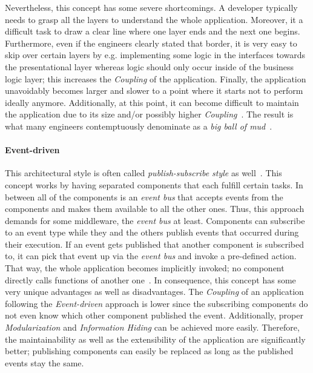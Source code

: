 \documentclass[12pt,a4paper,twoside]{report}
\begin{document}
Nevertheless, this concept has some severe shortcomings.
A developer typically needs to grasp all the layers to understand the whole application.
Moreover, it a difficult task to draw a clear line where one layer ends and the
next one begins.
Furthermore, even if the engineers clearly stated that border,
it is very easy to skip over certain layers by e.g. implementing some logic
in the interfaces towards the presentational layer whereas logic should only occur
inside of the business logic layer; this increases the \textit{Coupling} of the application.
Finally, the application unavoidably becomes larger and slower to a point
where it starts not to perform ideally anymore.
Additionally, at this point, it can become difficult to maintain the application due
to its size and/or possibly higher \textit{Coupling}~\cite{richards-sa-patterns}.
The result is what many engineers contemptuously denominate
as a \textit{big ball of mud}~\cite{fairbanks-sa}.

\paragraph{Event-driven}
This architectural style is often called \textit{publish-subscribe style} as well~\cite{fairbanks-sa}.
This concept works by having separated components that each fulfill certain tasks.
In between all of the components is an \textit{event bus} that accepts events from
the components and makes them available to all the other ones. Thus, this approach
demands for some middleware, the \textit{event bus} at least.
Components can subscribe to an event type while they and the others publish events
that occurred during their execution. If an event gets published that another component
is subscribed to, it can pick that event up via the \textit{event bus} and invoke
a pre-defined action. That way, the whole application becomes implicitly invoked;
no component directly calls functions of another one~\cite{garlan-shaw-sa}.
In consequence, this concept has some very unique advantages as well as disadvantages.
The \textit{Coupling} of an application following the \textit{Event-driven} approach
is lower since the subscribing components do not even know which other component
published the event. Additionally, proper \textit{Modularization} and \textit{Information Hiding}
can be achieved more easily. Therefore, the maintainability as well as the extensibility
of the application are significantly better; publishing components can easily be replaced
as long as the published events stay the same.
\end{document}
